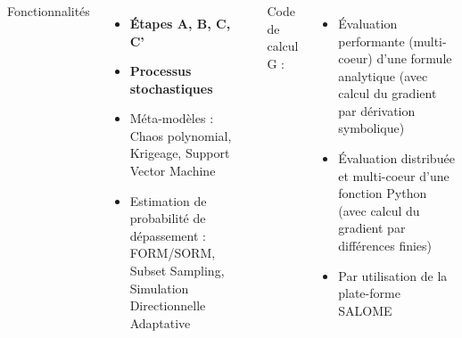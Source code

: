 \documentclass{beamer}
\begin{document}
\begin{frame}[containsverbatim]
\frametitle{\ot{}}

  \begin{columns}
	
Fonctionnalités
\begin{itemize}
\item {\bf Étapes A, B, C, C'}
\item {\bf Processus stochastiques}
\item Méta-modèles : Chaos polynomial, Krigeage, Support Vector Machine
\item Estimation de probabilité de dépassement : 
FORM/SORM, Subset Sampling, Simulation Directionnelle Adaptative
\end{itemize}


Code de calcul G :
\begin{itemize}
\item Évaluation performante (multi-coeur) d'une formule analytique (avec calcul du 
gradient par dérivation symbolique)
\item Évaluation distribuée et multi-coeur d'une fonction Python (avec calcul du gradient 
par différences finies)
\item Par utilisation de la plate-forme SALOME
\end{itemize}

	\end{columns}

\end{frame}

\end{document}
